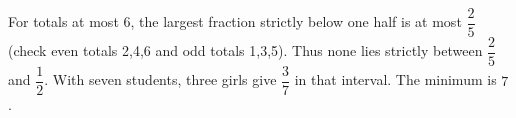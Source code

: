 For totals at most 6, the largest fraction strictly below one half is at most $\dfrac{2}{5}$ (check even totals 2,4,6 and odd totals 1,3,5). Thus none lies strictly between $\dfrac{2}{5}$ and $\dfrac{1}{2}$. With seven students, three girls give $\dfrac{3}{7}$ in that interval. The minimum is $\boxed7$.
